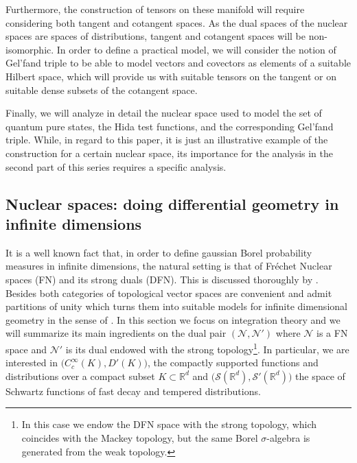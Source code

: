 \documentclass[12pt]{article}%
\begin{document}
Furthermore, the construction of tensors on these manifold will require considering both tangent and cotangent spaces. As the dual spaces of the nuclear spaces are spaces of distributions, tangent and cotangent spaces will be  non-isomorphic. In order to define a practical model, we will consider the notion of Gel'fand triple to be able to model vectors and covectors as elements of a suitable Hilbert space, which will provide us with suitable tensors on the tangent or on suitable dense subsets of the cotangent space. 

Finally, we will analyze in detail the nuclear space used to model the set of quantum pure states, the Hida test functions, and the corresponding Gel'fand triple. While, in regard to this paper, it is just an illustrative example of the construction for a certain nuclear space, its importance for the analysis in the second part of this series requires a specific analysis. 


\subsection{Nuclear spaces: doing differential geometry in infinite dimensions}
It is a well known fact that, in order to define gaussian Borel probability measures in infinite dimensions, the natural setting is that of Fréchet Nuclear spaces (FN) and its strong duals (DFN). This is discussed thoroughly by \cite{Gellfand}.  Besides both categories of topological vector spaces are convenient and admit partitions of unity which turns them into suitable models for infinite dimensional geometry in the sense of \cite{Kriegl1997}.  In this section we focus on integration theory and we will summarize its main ingredients on the dual pair  $(\mathcal{N},\mathcal{N}')$ where $\mathcal{N}$ is a FN space and $\mathcal{N}'$ is its dual endowed with the strong topology\footnote{In this case we endow the DFN space with the strong topology, which coincides with the Mackey topology, but the same Borel $\sigma$-algebra is generated from the weak topology. }. In particular, we are interested in
$\big(C^{\infty}_c(K),D'(K)\big)$, the compactly supported functions and distributions over a compact subset $K\subset \mathbb{R}^{d}$ and $\big(\mathcal{S}(\mathbb{R}^d),\mathcal{S}'(\mathbb{R}^d)\big)$ the space of Schwartz functions of fast decay and tempered distributions. 
 
\end{document}
